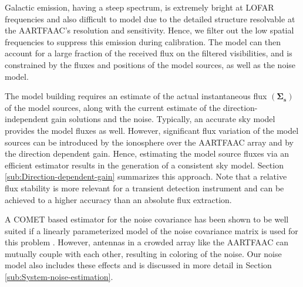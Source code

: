 \documentclass[referee]{aa}
\begin{document}
Galactic  emission,  having a  steep  spectrum,  is  extremely bright  at  LOFAR
frequencies and also difficult to model due to the detailed structure resolvable
at  the AARTFAAC's  resolution and  sensitivity. Hence,  we filter  out  the low
spatial frequencies to suppress this  emission during calibration. The model can
then  account  for  a large  fraction  of  the  received  flux on  the  filtered
visibilities,  and is  constrained  by the  fluxes  and positions  of the  model
sources, as well as the noise model. 

The  model  building requires  an  estimate  of  the actual  instantaneous  flux
$\left(\mathbf{\Sigma_{s}}\right)$ of the model  sources, along with the current
estimate of the  direction-independent gain solutions and  the noise. Typically,
an accurate sky  model provides the model fluxes  as well.  However, significant
flux variation of the model sources can be introduced by the ionosphere over the
AARTFAAC array and by  the direction dependent  gain.  Hence, estimating
the model source fluxes via an  efficient estimator results in the generation of
a consistent  sky model.  Section  \ref{sub:Direction-dependent-gain} summarizes
this  approach.  Note  that a  relative flux  stability is  more relevant  for a
transient detection instrument and can be achieved to a higher accuracy than an
absolute flux extraction.  

A  COMET based estimator  for the  noise covariance  has been  shown to  be well
suited if a linearly parameterized model  of the noise covariance matrix is used
for this problem \citep{ottersten1998covariance}.  However, antennas in a crowded
array  like the  AARTFAAC  can mutually  couple  with each  other, resulting  in
coloring  of the  noise. Our  noise  model also  includes these effects and  is
discussed in more detail in Section \ref{sub:System-noise-estimation}.

\end{document}

